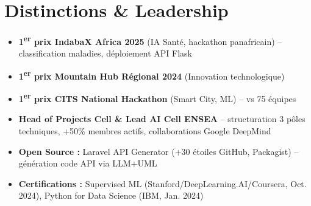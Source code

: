\documentclass[a4paper,11pt]{article}
\begin{document}
\begin{itemize}[leftmargin=*, label={-}]
\end{itemize}

\section{Distinctions \& Leadership}
\begin{itemize}[leftmargin=*, label=\tiny$\bullet$, nosep]
    \item \small{\textbf{1\textsuperscript{er} prix IndabaX Africa 2025} (IA Santé, hackathon panafricain) -- classification maladies, déploiement API Flask}
    \item \small{\textbf{1\textsuperscript{er} prix Mountain Hub Régional 2024} (Innovation technologique)}
    \item \small{\textbf{1\textsuperscript{er} prix CITS National Hackathon} (Smart City, ML) -- vs 75 équipes}
    \item \small{\textbf{Head of Projects Cell \& Lead AI Cell ENSEA} -- structuration 3 pôles techniques, +50\% membres actifs, collaborations Google DeepMind}
    \item \small{\textbf{Open Source :} Laravel API Generator (+30 étoiles GitHub, Packagist) -- génération code API via LLM+UML}
    \item \small{\textbf{Certifications :} Supervised ML (Stanford/DeepLearning.AI/Coursera, Oct. 2024), Python for Data Science (IBM, Jan. 2024)}
\end{itemize}
\end{document}
